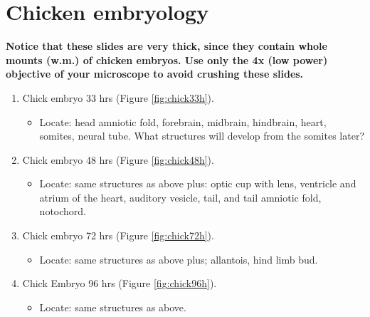 \documentclass[]{book}
\providecommand{\tightlist}{%
  \setlength{\itemsep}{0pt}\setlength{\parskip}{0pt}}
\let\BeginKnitrBlock\begin \let\EndKnitrBlock\end
\begin{document}
\hypertarget{chicken-embryology}{%
\section{Chicken embryology}\label{chicken-embryology}}

\BeginKnitrBlock{rmdcaution}
\textbf{Notice that these slides are very thick, since they contain whole
mounts (w.m.) of chicken embryos. Use only the 4x (low power) objective of your microscope to avoid crushing these slides.}
\EndKnitrBlock{rmdcaution}

\begin{enumerate}
\def\labelenumi{\arabic{enumi}.}
\tightlist
\item
  Chick embryo 33 hrs (Figure \ref{fig:chick33h}).

  \begin{itemize}
  \tightlist
  \item
    Locate: head amniotic fold, forebrain, midbrain, hindbrain, heart, somites, neural tube. What structures will develop from the somites later?
  \end{itemize}
\item
  Chick embryo 48 hrs (Figure \ref{fig:chick48h}).

  \begin{itemize}
  \tightlist
  \item
    Locate: same structures as above plus: optic cup with lens, ventricle and atrium of the heart, auditory vesicle, tail, and tail amniotic fold, notochord.
  \end{itemize}
\item
  Chick embryo 72 hrs (Figure \ref{fig:chick72h}).

  \begin{itemize}
  \tightlist
  \item
    Locate: same structures as above plus; allantois, hind limb bud.
  \end{itemize}
\item
  Chick Embryo 96 hrs (Figure \ref{fig:chick96h}).

  \begin{itemize}
  \tightlist
  \item
    Locate: same structures as above.
  \end{itemize}
\end{enumerate}
\end{document}
